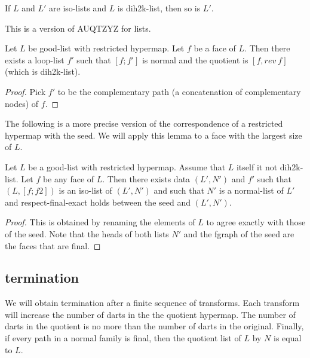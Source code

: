 \begin{lemma} If $L$ and $L'$ are iso-lists and $L$ is dih2k-list, then so is $L'$.
\end{lemma}

This is a version of AUQTZYZ for lists.

\begin{lemma}  Let $L$ be good-list with restricted hypermap.
Let $f$ be a face of $L$.  Then there exists a loop-list $f'$ such that $[f;f']$ is normal and the quotient
is $[f,rev~f]$ (which is dih2k-list).
\end{lemma}

\begin{proof} Pick $f'$ to be the complementary path (a concatenation of complementary nodes) of $f$.
\end{proof}

The following is a more precise version of the correspondence of a restricted hypermap with
the seed.  We will apply this lemma to a face with the largest size of $L$.

\begin{lemma}  Let $L$ be a good-list with restricted hypermap.  Assume
that $L$ itself it not dih2k-list.  Let $f$ be any face of $L$.  Then there exists data $(L',N')$ and $f'$
such that $(L,[f;f2])$ is an iso-list of $(L',N')$ and such that $N'$ is a normal-list of $L'$ and
respect-final-exact holds between the seed and $(L',N')$.
\end{lemma}

\begin{proof} This is obtained by renaming the elements of $L$ to agree exactly with those of the seed.
Note that the heads of both lists $N'$ and the fgraph of the seed are the faces that are final.
\end{proof}





\subsection{termination}

We will obtain termination after a finite sequence of transforms.  Each transform
will increase the number of darts in the the quotient hypermap.  The number of
darts in the quotient is no more than the number of darts in the original.  Finally,
if every path in a normal family is final, then the quotient list of $L$ by $N$ is equal to $L$.


